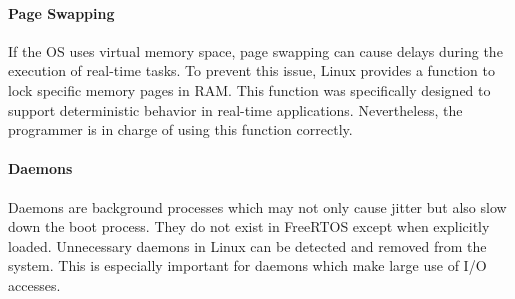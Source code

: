 \paragraph{Page Swapping}
If the \ac{OS} uses virtual memory space, page swapping can cause delays during the execution of real-time tasks.
To prevent this issue, Linux provides a function to lock specific memory pages in \ac{RAM}.
This function was specifically designed to support deterministic behavior in real-time applications.
Nevertheless, the programmer is in charge of using this function correctly.

\paragraph{Daemons}
Daemons are background processes which may not only cause jitter but also slow down the boot process. 
They do not exist in FreeRTOS except when explicitly loaded.
Unnecessary daemons in Linux can be detected and removed from the system.
This is especially important for daemons which make large use of \ac{I/O} accesses.

